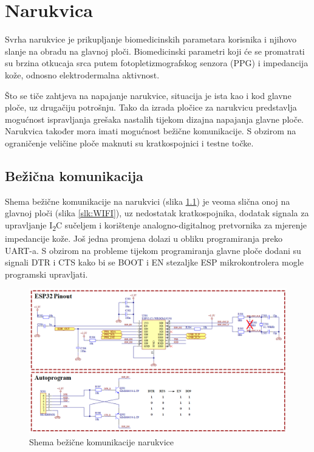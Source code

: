 \chapter{Narukvica}
\label{pog:bracelet}
Svrha narukvice je prikupljanje biomedicinskih parametara korisnika i njihovo slanje na obradu na glavnoj ploči. Biomedicinski parametri koji će se promatrati su brzina otkucaja srca putem fotopletizmografskog senzora (PPG) i impedancija kože, odnosno elektrodermalna aktivnost. 

Što se tiče zahtjeva na napajanje narukvice, situacija je ista kao i kod glavne ploče, uz drugačiju potrošnju. Tako da izrada pločice za narukvicu predstavlja mogućnost ispravljanja grešaka nastalih tijekom dizajna napajanja glavne ploče. Narukvica također mora imati mogućnost bežične komunikacije. S obzirom na ograničenje veličine ploče maknuti su kratkospojnici i testne točke.

\section{Bežična komunikacija}
Shema bežične komunikacije na narukvici (slika \ref{slk:BR_WIRELESS}) je veoma slična onoj na glavnoj ploči (slika \ref{slk:WIFI}), uz nedostatak kratkospojnika, dodatak signala za upravljanje I\textsubscript{2}C sučeljem i korištenje analogno-digitalnog pretvornika za mjerenje impedancije kože. Još jedna promjena dolazi u obliku programiranja preko UART-a. S obzirom na probleme tijekom programiranja glavne ploče dodani su signali DTR i CTS kako bi se BOOT i EN stezaljke ESP mikrokontrolera mogle programski upravljati.
\begin{figure}
    \centering
    \includegraphics[width=1\textwidth]{Figures/BR_WIRELESS.png}
    \caption{Shema bežične komunikacije narukvice}
    \label{slk:BR_WIRELESS}
\end{figure}

